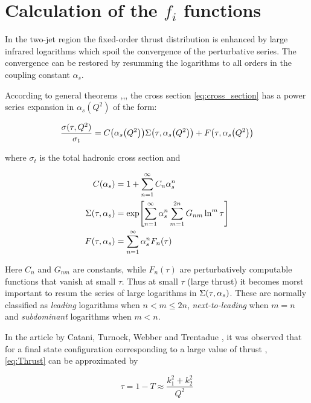 \documentclass[../main.tex]{subfiles}
\begin{document}

\section{Calculation of the $f_i$ functions}\label{sec:f functions}

In the two-jet region the fixed-order thrust distribution is enhanced by large infrared
logarithms which spoil the convergence of the perturbative series. The convergence can be
restored by resumming the logarithms to all orders in the coupling constant $\alpha_s$.

According to general theorems \cite{Block:1937},\cite{Kinoshita:1962ur},\cite{Lee:1964is}, 
the cross section \cref{eq:cross_section} has a power series expansion in $\alpha_s(Q^2)$ of the form:

\begin{equation}
    \frac{\sigma(\tau,Q^2)}{\sigma_t} =  C\qty(\alpha_s\qty(Q^2))\Sigma\qty(\tau,\alpha_s\qty(Q^2))+F\qty(\tau,\alpha_s\qty(Q^2))
\end{equation}

where $\sigma_t$ is the total hadronic cross section and    

\begin{subequations}
\begin{align}
    C\qty(\alpha_s) &= 1 + \sum_{n=1}^{\infty} C_n \alpha_s^n \\
    \Sigma\qty(\tau,\alpha_s)&= \exp[\sum_{n=1}^\infty \alpha_s^n \sum_{m=1}^{2n}G_{nm}\ln^m\tau] \\
    F(\tau,\alpha_s) &= \sum_{n=1}^{\infty} \alpha_s^n F_n(\tau)
\end{align}
\end{subequations}

Here $C_n$ and $G_{nm}$ are constants, while $F_n(\tau)$ are perturbatively computable functions that vanish at small $\tau$.
Thus at small $\tau$ (large thrust) it becomes morst important to resum the series of large logarithms in $\Sigma\qty(\tau,\alpha_s)$.
These are normally classified as \emph{leading} logarithms when $n < m \le 2n$, \emph{next-to-leading} when $m = n$ 
and \emph{subdominant} logarithms when $m < n$. 

In the article by Catani, Turnock, Webber and Trentadue \cite{CATANI1991491}, it was observed that 
for a final state configuration corresponding to a large value of thrust , \cref{eq:Thrust} can be approximated by

\begin{equation}
    \tau = 1-T \approx \frac{k_1^2+k_2^2}{Q^2}
\end{equation}
\end{document}

